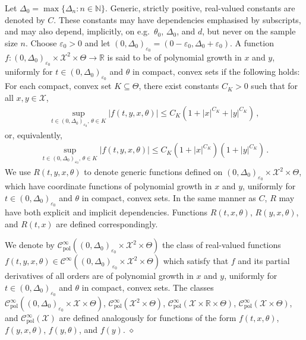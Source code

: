 \documentclass[11pt,a4paper]{article}
\newcommand{\varepsilonn}{{\varepsilon_0}}
\newcommand{\RR}{{\mathbb R}}
\newcommand{\NN}{{\mathbb N}}
\newcommand{\cc}{{\mathcal{C}}}
\newcommand{\xx}{{\mathcal{X}}}
\newcommand{\dqed}{{\leavevmode \unskip \penalty9999 \hbox{} \nobreak \hfill \quad \hbox{$\diamond$}}}
\numberwithin{equation}{section}
\numberwithin{theorem}{section}
\begin{document}
Let $\Delta_0 = \max\{\Delta_n: n\in \NN \}$. Generic, strictly positive, real-valued constants are denoted by $C$. These constants may have dependencies emphasised by subscripts, and may also depend, implicitly, on e.g.\ $\theta_0$, $\Delta_0$, and $d$, but never on the sample size $n$. Choose $\varepsilon_0 > 0$ and let $(0,\Delta_0)_{\varepsilon_0} = (0-\varepsilon_0, \Delta_0+\varepsilon_0)$. A function $f: (0,\Delta_0)_{\varepsilon_0} \times \xx^2 \times \Theta \to \RR$ is said to be of polynomial growth in $x$ and $y$, uniformly for $t\in (0,\Delta_0)_\varepsilonn$ and $\theta$ in compact, convex sets if the following holds: For each compact, convex set $K \subseteq \Theta$, there exist constants $C_K>0$ such that for all $x,y \in \xx$,
\begin{align*}
  \sup_{t \in (0,\Delta_0)_{\varepsilon_0},\,\theta \in K} \left|f(t,y,x, \theta)\right|
  \leq C_K\left(1 + |x|^{C_K} + |y|^{C_K}\right)\,,
\end{align*}
or, equivalently,
\begin{align*}
  \sup_{t \in (0,\Delta_0)_{\varepsilon_0},\,\theta \in K} \left|f(t,y,x, \theta)\right|
  \leq C_K\left(1 + |x|^{C_K}\right)\left(1+|y|^{C_K}\right) \,.
\end{align*}
We use $R(t,y,x, \theta)$ to denote generic functions defined on $(0,\Delta_0)_{\varepsilon_0} \times \xx^2 \times \Theta$, which have coordinate functions of polynomial growth in $x$ and $y$, uniformly for $t\in (0,\Delta_0)_{\varepsilon_0}$ and $\theta$ in compact, convex sets. In the same manner as $C$, $R$ may have both explicit and implicit dependencies. Functions $R(t,x, \theta)$, $R(y,x, \theta)$, and $R(t,x)$ are defined correspondingly.
\begin{definition}
We denote by $\cc_\text{pol}^\infty ( (0,\Delta_0)_\varepsilonn\times \xx^2 \times \Theta)$ the class of real-valued functions $f(t,y,x, \theta) \in \cc^\infty ((0,\Delta_0)_\varepsilonn\times \xx^2 \times \Theta)$ which satisfy that $f$ and its partial derivatives of all orders are of polynomial growth in $x$ and $y$, uniformly for $t \in (0,\Delta_0)_\varepsilonn$ and $\theta$ in compact, convex sets. The classes $\cc^\infty_\text{pol} ((0,\Delta_0)_\varepsilonn \times \xx \times  \Theta)$, $\cc^\infty_\text{pol}( \xx^2 \times \Theta )$, $\cc^\infty_\text{pol}( \xx\times \RR \times \Theta)$, $\cc^\infty_\text{pol}( \xx \times \Theta)$, and $\cc^\infty_\text{pol}( \xx )$ are defined analogously for functions of the form $f(t,x, \theta)$, $f(y,x,\theta)$, $f(y,\theta)$, and $f(y)$. \dqed
\end{definition}
\end{document}
